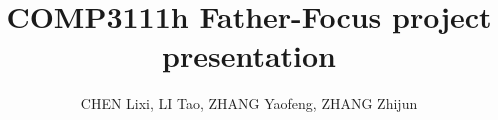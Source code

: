 \documentclass{beamer}
\begin{document}
\title{COMP3111h Father-Focus project presentation}
\author{CHEN Lixi, LI Tao, ZHANG Yaofeng, ZHANG Zhijun}

\begin{frame}
\titlepage
\end{frame}
\end{document}
